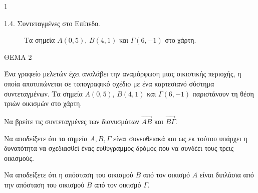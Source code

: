 \begin{ylh}{1}
    \item 1.4. Συντεταγμένες στο Επίπεδο.
\end{ylh}
\begin{figure}
\centering
{}
\caption*{Τα σημεία $A(0,5)$, $B(4,1)$ και $\Gamma(6,-1)$ στο χάρτη.}
\end{figure}

ΘΕΜΑ 2

Ένα γραφείο μελετών έχει αναλάβει την αναμόρφωση μιας οικιστικής περιοχής, η οποία αποτυπώνεται σε τοπογραφικό σχέδιο με ένα καρτεσιανό σύστημα συντεταγμένων. Τα σημεία $A(0,5)$, $B(4,1)$ και $\Gamma(6,-1)$ παριστάνουν τη θέση τριών οικισμών στο χάρτη.

\begin{alist}
    \item \begin{rlist}
        \item Να βρείτε τις συντεταγμένες των διανυσμάτων $\vec{AB}$ και $\vec{B\Gamma}$. 
        \item Να αποδείξετε ότι τα σημεία $A, B, \Gamma$ είναι συνευθειακά και ως εκ τούτου υπάρχει η δυνατότητα να σχεδιασθεί ένας ευθύγραμμος δρόμος που να συνδέει τους τρεις οικισμούς. 
    \end{rlist}
    \item Να αποδείξετε ότι η απόσταση του οικισμού $B$ από τον οικισμό $A$ είναι διπλάσια από την απόσταση του οικισμού $B$ από τον οικισμό $\Gamma$. 
\end{alist}